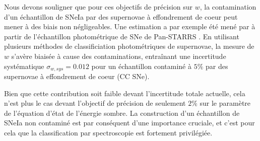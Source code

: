 \documentclass[../main/main.tex]{subfiles}
\begin{document}
Nous devons souligner que pour ces objectifs de précision sur $w$, la
contamination d'un échantillon de SNeIa par des supernovae à
effondrement de coeur peut mener à des biais non négligeables. Une
estimation a par exemple été mené par \citet{JonesScolnic17SNcontam,Jones2018} à partir de l'échantillon photométrique de SNe de
Pan-STARRS \citep[PS1,][]{ChambersPS1survey}. En utilisant plusieurs méthodes
de classificiation photométriques de supernovae, la mesure
de $w$ s'avère biaisée à cause des contaminations, entraînant une
incertitude systématique $\sigma_{w,sys}=0.012$ pour un échantillon
contaminé à $5\%$ par des supernovae à effondrement de coeur (CC SNe).

Bien que cette contribution soit faible devant l'incertitude totale
actuelle, cela n'est plus le cas devant l'objectif de précision de
seulement $2\%$ sur le paramètre de l'équation d'état de
l'énergie sombre. La construction d'un échantillon de SNeIa non
contaminé est par conséquent d'une importance cruciale, et c'est pour
cela que la classification par spectroscopie est fortement privilégiée.



\end{document}
